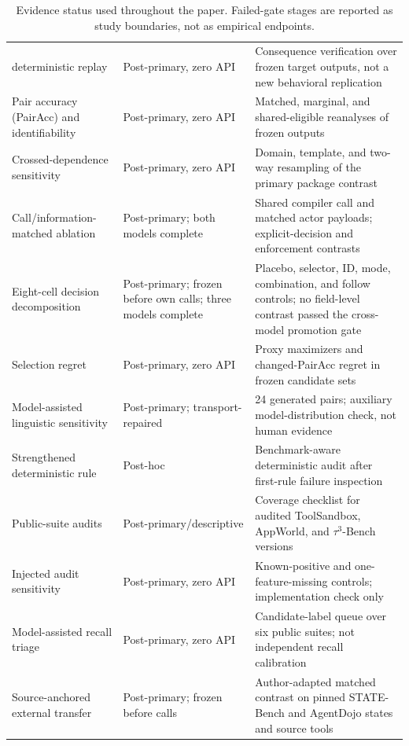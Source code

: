 \documentclass[10pt]{article}
\begin{document}
\begin{table}[H]
\begin{tabular}{p{}p{}p{}}
\NewSchemaReplication{} deterministic replay & Post-primary, zero API & Consequence verification over frozen target outputs, not a new behavioral replication \\
Pair accuracy (PairAcc) and identifiability & Post-primary, zero API & Matched, marginal, and shared-eligible reanalyses of frozen outputs \\
Crossed-dependence sensitivity & Post-primary, zero API & Domain, template, and two-way resampling of the primary package contrast \\
Call/information-matched ablation & Post-primary; both models complete & Shared compiler call and matched actor payloads; explicit-decision and enforcement contrasts \\
Eight-cell decision decomposition & Post-primary; frozen before own calls; three models complete & Placebo, selector, ID, mode, combination, and follow controls; no field-level contrast passed the cross-model promotion gate \\
Selection regret & Post-primary, zero API & Proxy maximizers and changed-PairAcc regret in frozen candidate sets \\
Model-assisted linguistic sensitivity & Post-primary; transport-repaired & 24 generated pairs; auxiliary model-distribution check, not human evidence \\
Strengthened deterministic rule & Post-hoc & Benchmark-aware deterministic audit after first-rule failure inspection \\
Public-suite audits & Post-primary/descriptive & Coverage checklist for audited ToolSandbox, AppWorld, and $\tau^3$-Bench versions \\
Injected audit sensitivity & Post-primary, zero API & Known-positive and one-feature-missing controls; implementation check only \\
Model-assisted recall triage & Post-primary, zero API & Candidate-label queue over six public suites; not independent recall calibration \\
Source-anchored external transfer & Post-primary; frozen before calls & Author-adapted matched contrast on pinned STATE-Bench and AgentDojo states and source tools \\
\bottomrule
\end{tabular}
\caption{Evidence status used throughout the paper. Failed-gate stages are reported as study
boundaries, not as empirical endpoints.}
\label{tab:supp-chronology}
\end{table}
\end{document}
